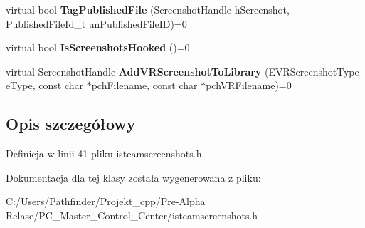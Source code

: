 \begin{DoxyCompactItemize}
virtual bool {\bfseries Tag\+Published\+File} (Screenshot\+Handle h\+Screenshot, Published\+File\+Id\+\_\+t un\+Published\+File\+ID)=0
\item 
\mbox{\label{class_i_steam_screenshots_ac700b823da4dbe0f7973851929c28513}} 
virtual bool {\bfseries Is\+Screenshots\+Hooked} ()=0
\item 
\mbox{\label{class_i_steam_screenshots_a0aeb3b2ed69411ff420f1c4420649ce0}} 
virtual Screenshot\+Handle {\bfseries Add\+V\+R\+Screenshot\+To\+Library} (E\+V\+R\+Screenshot\+Type e\+Type, const char $\ast$pch\+Filename, const char $\ast$pch\+V\+R\+Filename)=0
\end{DoxyCompactItemize}


\subsection{Opis szczegółowy}


Definicja w linii 41 pliku isteamscreenshots.\+h.



Dokumentacja dla tej klasy została wygenerowana z pliku\+:\begin{DoxyCompactItemize}
\item 
C\+:/\+Users/\+Pathfinder/\+Projekt\+\_\+cpp/\+Pre-\/\+Alpha Relase/\+P\+C\+\_\+\+Master\+\_\+\+Control\+\_\+\+Center/isteamscreenshots.\+h\end{DoxyCompactItemize}
